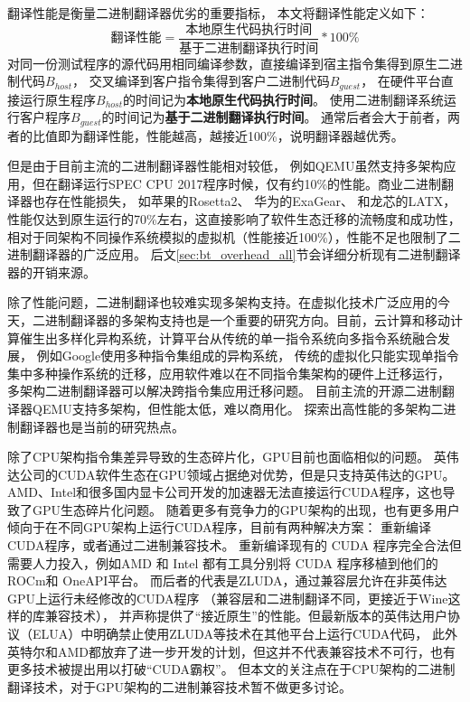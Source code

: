 翻译性能是衡量二进制翻译器优劣的重要指标，
本文将翻译性能定义如下：
\begin{equation}\label{eq:bt_performance}
    \text{翻译性能} = \frac{\text{本地原生代码执行时间}}{\text{基于二进制翻译执行时间}} * 100\%
\end{equation}
对同一份测试程序的源代码用相同编译参数，直接编译到宿主指令集得到原生二进制代码$B_{host}$，
交叉编译到客户指令集得到客户二进制代码$B_{guest}$，
在硬件平台直接运行原生程序$B_{host}$的时间记为\textbf{本地原生代码执行时间}。
使用二进制翻译系统运行客户程序$B_{guest}$的时间记为\textbf{基于二进制翻译执行时间}。
通常后者会大于前者，两者的比值即为翻译性能，性能越高，越接近100\%，说明翻译器越优秀。


但是由于目前主流的二进制翻译器性能相对较低，
例如QEMU\cite{bellardQEMUFastPortable2005}虽然支持多架构应用，但在翻译运行SPEC CPU 2017\cite{SPECCPU2017}程序时候，仅有约10\%的性能。商业二进制翻译器也存在性能损失，
如苹果的Rosetta2\cite{RosettaTranslationEnvironment, RunningIntelBinaries}、
华为的ExaGear\cite{KunPengExaGear}、
和龙芯的LATX\cite{LoongArchEnv2022, LoongArch2023}，
性能仅达到原生运行的70\%左右，这直接影响了软件生态迁移的流畅度和成功性，
相对于同架构不同操作系统模拟的虚拟机（性能接近100\%），性能不足也限制了二进制翻译器的广泛应用。
后文\ref{sec:bt_overhead_all}节会详细分析现有二进制翻译器的开销来源。

除了性能问题，二进制翻译也较难实现多架构支持。在虚拟化技术广泛应用的今天，二进制翻译器的多架构支持也是一个重要的研究方向。目前，云计算和移动计算催生出多样化异构系统，计算平台从传统的单一指令系统向多指令系统融合发展，
例如Google使用多种指令集组成的异构系统，
传统的虚拟化只能实现单指令集中多种操作系统的迁移，应用软件难以在不同指令集架构的硬件上迁移运行，
多架构二进制翻译器可以解决跨指令集应用迁移问题。
目前主流的开源二进制翻译器QEMU支持多架构，但性能太低，难以商用化。
探索出高性能的多架构二进制翻译器也是当前的研究热点。

除了CPU架构指令集差异导致的生态碎片化，GPU目前也面临相似的问题。
英伟达公司的CUDA软件生态在GPU领域占据绝对优势，但是只支持英伟达的GPU。
AMD、Intel和很多国内显卡公司开发的加速器无法直接运行CUDA程序，这也导致了GPU生态碎片化问题。
随着更多有竞争力的GPU架构的出现，也有更多用户倾向于在不同GPU架构上运行CUDA程序，目前有两种解决方案：
重新编译CUDA程序，或者通过二进制兼容技术。
重新编译现有的 CUDA 程序完全合法但需要人力投入，例如AMD 和 Intel 都有工具分别将 CUDA 程序移植到他们的 ROCm和 OneAPI平台。
而后者的代表是ZLUDA\cite{ZLUDA}，通过兼容层允许在非英伟达GPU上运行未经修改的CUDA程序
（兼容层和二进制翻译不同，更接近于Wine这样的库兼容技术），
并声称提供了“接近原生”的性能。但最新版本的英伟达用户协议（ELUA）中明确禁止使用ZLUDA等技术在其他平台上运行CUDA代码，
此外英特尔和AMD都放弃了进一步开发的计划，但这并不代表兼容技术不可行，也有更多技术被提出用以打破“CUDA霸权”。
但本文的关注点在于CPU架构的二进制翻译技术，对于GPU架构的二进制兼容技术暂不做更多讨论。



